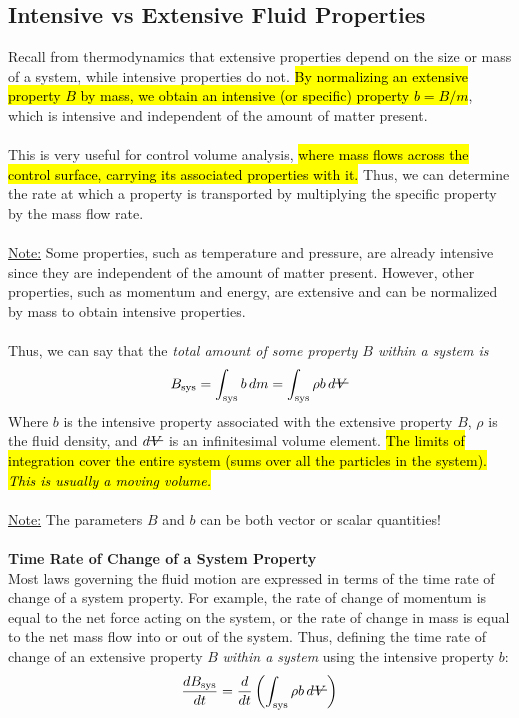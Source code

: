 ﻿\documentclass[12pt]{article}
\newcommand{\vol}{\mathord{\text{\ooalign{\hidewidth $V$\hidewidth\cr\kern-0.5pt\raisebox{0.8ex}{\rule[0pt]{1em}{0.5pt}}}}}}
\begin{document}
\subsection*{Intensive vs Extensive Fluid Properties}
Recall from thermodynamics that extensive properties depend on the size or mass of a system, while intensive properties do not. \hl{By normalizing an extensive property $B$ by mass, we obtain an intensive (or specific) property $b=B/m$}, which is intensive and independent of the amount of matter present.\\\\
This is very useful for control volume analysis, \hl{where mass flows across the control surface, carrying its associated properties with it.} Thus, we can determine the rate at which a property is transported by multiplying the specific property by the mass flow rate.\\\\
\underline{Note:} Some properties, such as temperature and pressure, are already intensive since they are independent of the amount of matter present. However, other properties, such as momentum and energy, are extensive and can be normalized by mass to obtain intensive properties.\\\\
Thus, we can say that the \textit{total amount of some property $B$ within a system is}
\[B_{\text{sys}} = \int_{\text{sys}} b \, dm = \int_{\text{sys}} \rho b\,d\vol\]
Where $b$ is the intensive property associated with the extensive property $B$, $\rho$ is the fluid density, and $d\vol$ is an infinitesimal volume element. \hl{The limits of integration cover the entire system (sums over all the particles in the system). \textit{This is usually a moving volume.}}\\\\
\underline{Note:} The parameters $B$ and $b$ can be both vector or scalar quantities!\\\\
\textbf{Time Rate of Change of a System Property}\\
Most laws governing the fluid motion are expressed in terms of the time rate of change of a system property. For example, the rate of change of momentum is equal to the net force acting on the system, or the rate of change in mass is equal to the net mass flow into or out of the system.
\newpage
Thus, defining the time rate of change of an extensive property $B$ \textit{within a system} using the intensive property $b$:
    \[\frac{dB_{\text{sys}}}{dt} =  \frac{d}{dt}\left(\int_{\text{sys}} \rho b\,d\vol\right)\]
\end{document}

